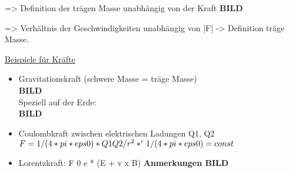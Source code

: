 => Definition der trägen Masse unabhängig von der Kraft
\textbf{BILD}

=> Verhältnis der Geschwindigkeiten unabhängig von |F| -> Definition träge Masse.

\underline{Beispiele für Kräfte}
\begin{itemize}
  \item Gravitationskraft (schwere Masse = träge Masse)\\
        \textbf{BILD}\\
        Speziell auf der Erde:\\ \textbf{BILD}
  \item Coulombkraft zwischen elektrischen Ladungen Q1, Q2\\
        \(F = 1/(4*pi*eps0) * Q1Q2/r^2 * ^r\\
        1 / (4 * pi * eps0) = const\)
  \item Lorentzkraft: F 0 e * (E + v x B) \textbf{Anmerkungen BILD}
\end{itemize}